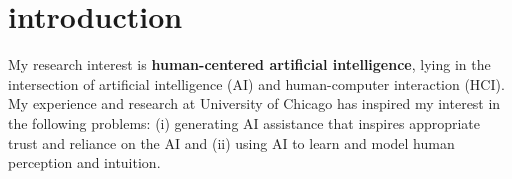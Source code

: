 
\section{introduction}




My research interest is \textbf{human-centered artificial intelligence}, lying in the intersection of artificial intelligence (AI) and human-computer interaction (HCI). 
My experience and research at University of Chicago has inspired my interest in the following problems: 
(i) generating AI assistance that inspires appropriate trust and reliance on the AI
and
(ii) using AI to learn and model human perception and intuition.
